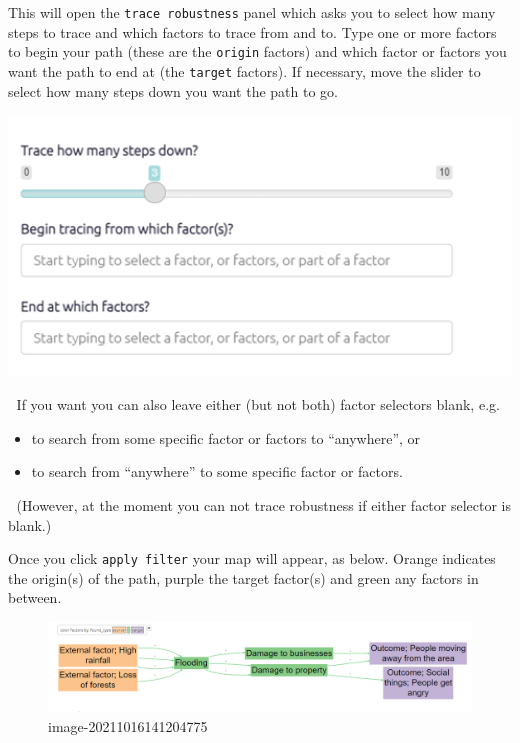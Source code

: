 \documentclass[
]{book}
\providecommand{\tightlist}{%
  \setlength{\itemsep}{0pt}\setlength{\parskip}{0pt}}
\begin{document}
This will open the \texttt{trace\ robustness} panel which asks you to select how many steps to trace and which factors to trace from and to. Type one or more factors to begin your path (these are the \texttt{origin} factors) and which factor or factors you want the path to end at (the \texttt{target} factors). If necessary, move the slider to select how many steps down you want the path to go.

\includegraphics[width=6.77083in,height=\textheight]{_assets/image-20211025151626916.png}

🧪 If you want you can also leave either (but not both) factor selectors blank, e.g.

\begin{itemize}
\tightlist
\item
  to search from some specific factor or factors to ``anywhere'', or
\item
  to search from ``anywhere'' to some specific factor or factors.
\end{itemize}

🧪 (However, at the moment you can not trace robustness if either factor selector is blank.)

Once you click \texttt{apply\ filter} your map will appear, as below. Orange indicates the origin(s) of the path, purple the target factor(s) and green any factors in between.

\begin{figure}
\centering
\includegraphics[width=6.77083in,height=\textheight]{_assets/image-20211016141204775.png}
\caption{image-20211016141204775}
\end{figure}
\end{document}
